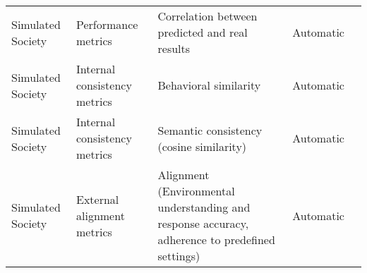 \begin{small}
\begin{center}
\begin{longtable}{@{}p{}p{}p{}p{}p{}@{}}
Simulated Society        & Performance metrics                 & Correlation between predicted and real results                                                                                                                                                              & Automatic & \cite{Mitsopoulos2024PsychologicallyValidGA}                                                                                                                                                                                                                                                                                                                                                                            \\
Simulated Society        & Internal consistency metrics        & Behavioral similarity                                                                                                                                                                                       & Automatic & \cite{Li2024EvolvingAI}                                                                                                                                                                                                                                                                                                                                                                                                    \\
Simulated Society        & Internal consistency metrics        & Semantic consistency (cosine similarity)                                                                                                                                                                    & Automatic & \cite{qiu2024interactiveagentssimulatingcounselorclient}                                                                                                                                                                                                                                                                                                                                                                                               \\
Simulated Society        & External alignment metrics          & Alignment (Environmental understanding and response accuracy, adherence to predefined settings)                                                                                                             & Automatic & \cite{gu2024agentgroupchatinteractivegroupchat}                                                                                                                                                                                                                                                                                                                                                                                        \\

\end{longtable}
\end{center}
\end{small}
